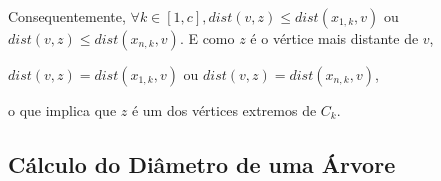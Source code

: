 \documentclass[a4paper,12pt]{article}
\begin{document}
\begin{itemize}
            Consequentemente, $\forall k \in [1, c], 
            dist(v, z)\le dist(x_{1, k}, v)$ ou
            $dist(v, z)\le dist(x_{n, k}, v)$. 
            E como $z$ é o vértice mais distante de $v$, 
            
            $dist(v, z)=dist(x_{1, k}, v)$ ou 
            $dist(v, z)=dist(x_{n, k}, v)$,

            o que implica que $z$ é um dos vértices extremos de 
            $C_k$.






        \end{itemize}
        
    \subsection{Cálculo do Diâmetro de uma Árvore}
    


\newpage
    
    
    
\end{document}
